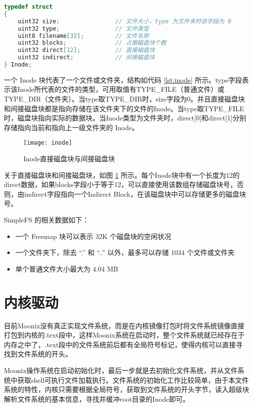 \begin{lstlisting}[language={C}, caption={SimpleFS Inode结构}, label={lst:inode}]
typedef struct
{
	uint32 size;                // 文件大小，type 为文件夹时该字段为 0
	uint32 type;                // 文件类型
	uint8 filename[32];         // 文件名称
	uint32 blocks;              // 占据磁盘块个数
	uint32 direct[12];          // 直接磁盘块
	uint32 indirect;            // 间接磁盘块
} Inode;
\end{lstlisting}

一个 Inode 块代表了一个文件或文件夹，结构如代码 \ref{lst:inode} 所示。type字段表示该Inode所代表的文件的类型，可用取值有TYPE\_FILE（普通文件）或TYPE\_DIR（文件夹）。当type取TYPE\_DIR时，size字段为0。并且直接磁盘块和间接磁盘块都是指向存储在该文件夹下的文件的Inode。当type取TYPE\_FILE时，磁盘块指向实际的数据块。当Inode类型为文件夹时，direct[0]和direct[1]分别存储指向当前和指向上一级文件夹的 Inode。

\begin{figure}[htpb]
	\centering
	\texttt{[image: inode]}
	\setlength{\abovecaptionskip}{2pt}
	\caption{Inode直接磁盘块与间接磁盘块}
	\label{pic:inode}
\end{figure}

关于直接磁盘块和间接磁盘块，如图 \ref{pic:inode} 所示。每个Inode块中有一个长度为12的direct数据，如果blocks字段小于等于12，可以直接使用该数组存储磁盘块号，否则，由indirect字段指向一个Indirect Block，在该磁盘块中可以存储更多的磁盘块号。

SimpleFS 的相关数据如下：

\begin{itemize}
	\item 一个 Freemap 块可以表示 32K 个磁盘块的空闲状况
	\item 一个文件夹下，除去 “.” 和 “..” 以外，最多可以存储 1034 个文件或文件夹
	\item 单个普通文件大小最大为 4.04 MB
\end{itemize}

\section{内核驱动}

目前Moonix没有真正实现文件系统，而是在内核镜像打包时将文件系统镜像直接打包到内核的.text段中，这样Moonix系统在启动时，整个文件系统就已经存在于内存之中了，.text段中的文件系统前后都有全局符号标记，使得内核可以直接寻找到文件系统的开头。

Moonix操作系统在启动初始化时，最后一步就是去初始化文件系统，并从文件系统中获取shell可执行文件加载执行。文件系统的初始化工作比较简单，由于本文件系统的特性，内核只需要根据全局符号，获取到文件系统的开头字节，读入超级块解析文件系统的基本信息，寻找并缓冲root目录的Inode即可。

